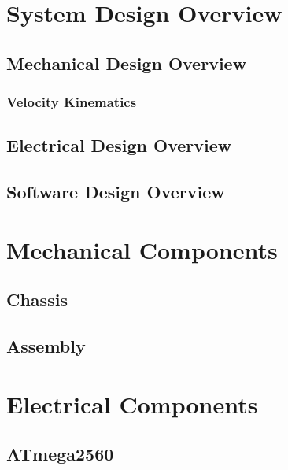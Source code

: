 \documentclass[letterpaper,12pt]{report}
\begin{document}
\pagebreak
\tableofcontents
\pagebreak

\chapter{System Design Overview}
\label{cha:system-design-overview}

\section{Mechanical Design Overview}
\label{sec:mechanical-design}

\subsection{Velocity Kinematics}
\label{sub:vel-kin}

\section{Electrical Design Overview}
\label{sec:electrical-design}

\section{Software Design Overview}
\label{sec:software-design}

\chapter{Mechanical Components}
\label{cha:mech-comp}

\section{Chassis}
\label{sec:chassis}

\section{Assembly}
\label{sec:assembly}

\chapter{Electrical Components}
\label{cha:elec-comp}

\section{ATmega2560}
\label{sec:atmega}
\end{document}

